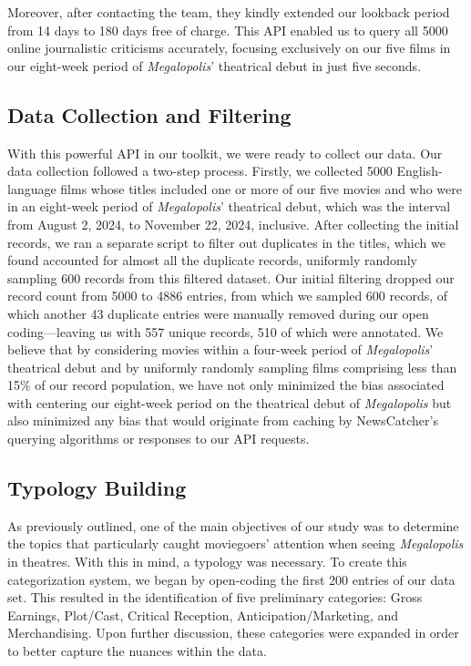 \documentclass[letterpaper]{article} %
\begin{document}
Moreover, after contacting the team, they kindly extended our lookback period from 14 days to 180 days free of charge. This API enabled us to query all 5000 online journalistic criticisms accurately, focusing exclusively on our five films in our eight-week period of \textit{Megalopolis}' theatrical debut in just five seconds.

\subsection{Data Collection and Filtering}

With this powerful API in our toolkit, we were ready to collect our data. Our data collection followed a two-step process. Firstly, we collected 5000 English-language films whose titles included one or more of our five movies and who were in an eight-week period of \textit{Megalopolis}' theatrical debut, which was the interval from August 2, 2024, to November 22, 2024, inclusive. After collecting the initial records, we ran a separate script to filter out duplicates in the titles, which we found accounted for almost all the duplicate records, uniformly randomly sampling 600 records from this filtered dataset. Our initial filtering dropped our record count from 5000 to 4886 entries, from which we sampled 600 records, of which another 43 duplicate entries were manually removed during our open coding—leaving us with 557 unique records, 510 of which were annotated. We believe that by considering movies within a four-week period of \textit{Megalopolis}' theatrical debut and by uniformly randomly sampling films comprising less than 15\% of our record population, we have not only minimized the bias associated with centering our eight-week period on the theatrical debut of \textit{Megalopolis} but also minimized any bias that would originate from caching by NewsCatcher's querying algorithms or responses to our API requests.



\subsection{Typology Building}

As previously outlined, one of the main objectives of our study was to determine the topics that particularly caught moviegoers’ attention when seeing \textit{Megalopolis} in theatres. With this in mind, a typology was necessary. To create this categorization system, we began by open-coding the first 200 entries of our data set. This resulted in the identification of five preliminary categories: Gross Earnings, Plot/Cast, Critical Reception, Anticipation/Marketing, and Merchandising. Upon further discussion, these categories were expanded in order to better capture the nuances within the data. 
\end{document}
